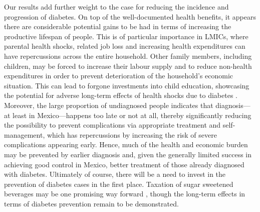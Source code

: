Our results add further weight to the case for reducing the incidence and progression of diabetes. On top of the well-documented health benefits, it appears there are considerable potential gains to be had in terms of increasing the productive lifespan of people. This is of particular importance in \acp{LMIC}, where parental health shocks, related job loss and increasing health expenditures can have repercussions across the entire household. Other family members, including children, may be forced to increase their labour supply and to reduce non-health expenditures in order to prevent deterioration of the household's economic situation. This can lead to forgone investments into child education, showcasing the potential for adverse long-term effects of health shocks due to diabetes \parencite{Bratti2014}. Moreover, the large proportion of undiagnosed people indicates that diagnosis---at least in Mexico---happens too late or not at all, thereby significantly reducing the possibility to prevent complications via appropriate treatment and self-management, which has repercussions by increasing the risk of severe complications appearing early. Hence, much of the health and economic burden may be prevented by earlier diagnosis and, given the generally limited success in achieving good control in Mexico, better treatment of those already diagnosed with diabetes. Ultimately of course, there will be a need to invest in the prevention of diabetes cases in the first place. Taxation of sugar sweetened beverages may be one promising way forward \parencite{Colchero2016}, though the long-term effects in terms of diabetes prevention remain to be demonstrated.





